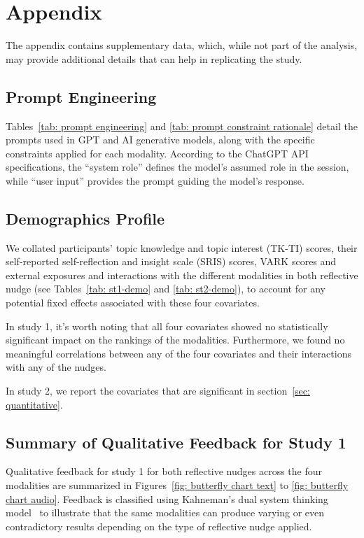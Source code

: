 \section*{Appendix}
The appendix contains supplementary data, which, while not part of the analysis, may provide additional details that can help in replicating the study. 

\subsection*{Prompt Engineering}
\label{sec: prompt engineering}
Tables~\ref{tab: prompt engineering} and \ref{tab: prompt constraint rationale} detail the prompts used in GPT and AI generative models, along with the specific constraints applied for each modality. According to the ChatGPT API specifications, the ``system role'' defines the model's assumed role in the session, while ``user input'' provides the prompt guiding the model's response.

\subsection*{Demographics Profile}
We collated participants' topic knowledge and topic interest (TK-TI) scores, their self-reported self-reflection and insight scale (SRIS) scores, VARK scores and external exposures and interactions with the different modalities in both reflective nudge (see Tables~\ref{tab: st1-demo} and \ref{tab: st2-demo}), to account for any potential fixed effects associated with these four covariates. 

In study 1, it's worth noting that all four covariates showed no statistically significant impact on the rankings of the modalities. Furthermore, we found no meaningful correlations between any of the four covariates and their interactions with any of the nudges.

In study 2, we report the covariates that are significant in section~\ref{sec: quantitative}.

\subsection*{Summary of Qualitative Feedback for Study 1}
Qualitative feedback for study 1 for both reflective nudges across the four modalities are summarized in Figures~\ref{fig: butterfly chart text} to \ref{fig: butterfly chart audio}. Feedback is classified using Kahneman's dual system thinking model~\cite{kahneman2002maps} to illustrate that the same modalities can produce varying or even contradictory results depending on the type of reflective nudge applied.

